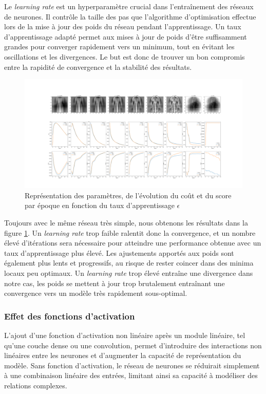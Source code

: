 \documentclass{article}
\begin{document}
Le \textit{learning rate} est un hyperparamètre crucial dans l'entraînement des réseaux de neurones. Il contrôle la taille des pas que l'algorithme d'optimisation effectue lors de la mise à jour des poids du réseau pendant l'apprentissage. Un taux d'apprentissage adapté permet aux mises à jour de poids d'être suffisamment grandes pour converger rapidement vers un minimum, tout en évitant les oscillations et les divergences. Le but est donc de trouver un bon compromis entre la rapidité de convergence et la stabilité des résultats.

\begin{figure}[htbp]
    \centering
    \includegraphics[width=\textwidth]{lr_effet.pdf}
    \caption{Représentation des paramètres, de l'évolution du coût et du score par époque en fonction du taux d'apprentissage $ \epsilon $}
    \label{fig:effetlearningrate}
\end{figure}

Toujours avec le même réseau très simple, nous obtenons les résultats dans la figure \ref{fig:effetlearningrate}. Un \textit{learning rate} trop faible ralentit donc la convergence, et un nombre élevé d'itérations sera nécessaire pour atteindre une performance obtenue avec un taux d'apprentissage plus élevé. Les ajustements apportés aux poids sont également plus lents et progressifs, au risque de rester coincer dans des minima locaux peu optimaux. Un \textit{learning rate} trop élevé entraîne une divergence dans notre cas, les poids se mettent à jour trop brutalement entraînant une convergence vers un modèle très rapidement sous-optimal.

\subsubsection{Effet des fonctions d'activation}

L'ajout d'une fonction d'activation non linéaire après un module linéaire, tel qu'une couche dense ou une convolution, permet d'introduire des interactions non linéaires entre les neurones et d'augmenter la capacité de représentation du modèle. Sans fonction d'activation, le réseau de neurones se réduirait simplement à une combinaison linéaire des entrées, limitant ainsi sa capacité à modéliser des relations complexes.
\end{document}
